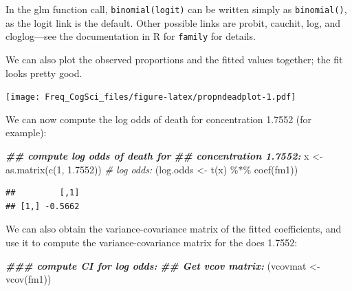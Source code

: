 \documentclass[
  12pt,
]{krantz}
\newenvironment{Shaded}{\begin{snugshade}}{\end{snugshade}}
\newcommand{\AttributeTok}[1]{\textcolor[rgb]{0.77,0.63,0.00}{#1}}
\newcommand{\CommentTok}[1]{\textcolor[rgb]{0.56,0.35,0.01}{\textit{#1}}}
\newcommand{\DecValTok}[1]{\textcolor[rgb]{0.00,0.00,0.81}{#1}}
\newcommand{\DocumentationTok}[1]{\textcolor[rgb]{0.56,0.35,0.01}{\textbf{\textit{#1}}}}
\newcommand{\FloatTok}[1]{\textcolor[rgb]{0.00,0.00,0.81}{#1}}
\newcommand{\FunctionTok}[1]{\textcolor[rgb]{0.00,0.00,0.00}{#1}}
\newcommand{\NormalTok}[1]{#1}
\newcommand{\OtherTok}[1]{\textcolor[rgb]{0.56,0.35,0.01}{#1}}
\newcommand{\SpecialCharTok}[1]{\textcolor[rgb]{0.00,0.00,0.00}{#1}}
\theoremstyle{definition}
\theoremstyle{definition}
\theoremstyle{definition}
\theoremstyle{definition}
\theoremstyle{remark}
\begin{document}
In the glm function call, \texttt{binomial(logit)} can be written simply as \texttt{binomial()}, as the logit link is the default. Other possible links are probit, cauchit, log, and cloglog---see the documentation in R for \texttt{family} for details.

We can also plot the observed proportions and the fitted values together; the fit looks pretty good.

\begin{Shaded}
\end{Shaded}

\texttt{[image: Freq\_CogSci\_files/figure-latex/propndeadplot-1.pdf]}

We can now compute the log odds of death for concentration 1.7552 (for example):

\begin{Shaded}
\begin{Highlighting}[]
\DocumentationTok{\#\# compute log odds of death for}
\DocumentationTok{\#\# concentration 1.7552:}
\NormalTok{x }\OtherTok{\textless{}{-}} \FunctionTok{as.matrix}\NormalTok{(}\FunctionTok{c}\NormalTok{(}\DecValTok{1}\NormalTok{, }\FloatTok{1.7552}\NormalTok{))}
\CommentTok{\# log odds:}
\NormalTok{(log.odds }\OtherTok{\textless{}{-}} \FunctionTok{t}\NormalTok{(x) }\SpecialCharTok{\%*\%} \FunctionTok{coef}\NormalTok{(fm1))}
\end{Highlighting}
\end{Shaded}

\begin{verbatim}
##         [,1]
## [1,] -0.5662
\end{verbatim}

We can also obtain the variance-covariance matrix of the fitted coefficients, and use it to compute the variance-covariance matrix for the does 1.7552:

\begin{Shaded}
\begin{Highlighting}[]
\DocumentationTok{\#\#\# compute CI for log odds:}
\DocumentationTok{\#\# Get vcov matrix:}
\NormalTok{(vcovmat }\OtherTok{\textless{}{-}} \FunctionTok{vcov}\NormalTok{(fm1))}
\end{Highlighting}
\end{Shaded}
\end{document}
